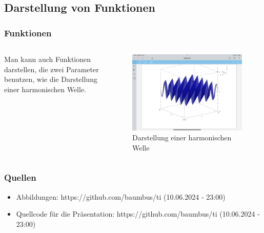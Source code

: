 \documentclass[10pt,ngerman]{beamer}
\begin{document}
\subsection{Darstellung von Funktionen}

\begin{frame}
	\frametitle{Funktionen}

	\begin{columns}
		\begin{column}{0.5\textwidth}
			Man kann auch Funktionen darstellen, die zwei Parameter benutzen, wie die Darstellung einer harmonischen Welle.
		\end{column}

		\begin{column}{0.5\textwidth}
			\begin{figure}
				\centering
				\includegraphics[width=\textwidth]{IMG_1448.png}
				\caption{Darstellung einer harmonischen Welle}
				\label{fig:Darstellung-Welle}
			\end{figure}
		\end{column}
	\end{columns}
\end{frame}

\begin{frame}
	\frametitle{Quellen}

	\begin{itemize}
		\item Abbildungen: https://github.com/baumbus/ti (10.06.2024 - 23:00)
		\item Quellcode für die Präsentation: https://github.com/baumbus/ti (10.06.2024 - 23:00)
	\end{itemize}

\end{frame}
\end{document}
